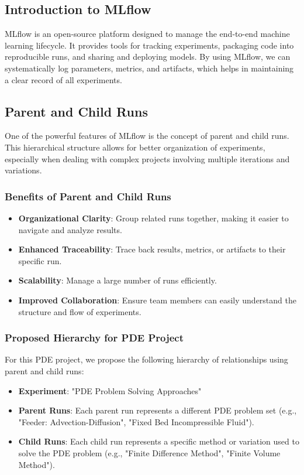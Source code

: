 \documentclass{article}
\begin{document}
\subsection{Introduction to MLflow}
MLflow is an open-source platform designed to manage the end-to-end machine learning lifecycle. It provides tools for tracking experiments, packaging code into reproducible runs, and sharing and deploying models. By using MLflow, we can systematically log parameters, metrics, and artifacts, which helps in maintaining a clear record of all experiments.

\subsection{Parent and Child Runs}
One of the powerful features of MLflow is the concept of parent and child runs. This hierarchical structure allows for better organization of experiments, especially when dealing with complex projects involving multiple iterations and variations.

\subsubsection{Benefits of Parent and Child Runs}
\begin{itemize}
    \item \textbf{Organizational Clarity}: Group related runs together, making it easier to navigate and analyze results.
    \item \textbf{Enhanced Traceability}: Trace back results, metrics, or artifacts to their specific run.
    \item \textbf{Scalability}: Manage a large number of runs efficiently.
    \item \textbf{Improved Collaboration}: Ensure team members can easily understand the structure and flow of experiments.
\end{itemize}

\subsubsection{Proposed Hierarchy for PDE Project}
For this PDE project, we propose the following hierarchy of relationships using parent and child runs:
\begin{itemize}
    \item \textbf{Experiment}: "PDE Problem Solving Approaches"
    \item \textbf{Parent Runs}: Each parent run represents a different PDE problem set (e.g., "Feeder: Advection-Diffusion", "Fixed Bed Incompressible Fluid").
    \item \textbf{Child Runs}: Each child run represents a specific method or variation used to solve the PDE problem (e.g., "Finite Difference Method", "Finite Volume Method").
\end{itemize}
\end{document}
